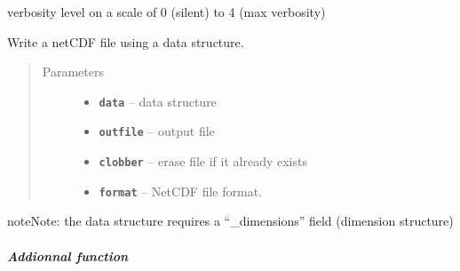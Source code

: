 \documentclass[letterpaper,10pt,english]{sphinxmanual}
\begin{document}
\begin{fulllineitems}
\begin{fulllineitems}
\label{altimetry.tools.nctools:altimetry.tools.nctools.nc.verbose}
verbosity level on a scale of 0 (silent) to 4 (max verbosity)

\end{fulllineitems}


\begin{fulllineitems}
\label{altimetry.tools.nctools:altimetry.tools.nctools.nc.write}
Write a netCDF file using a data structure.
\begin{quote}\begin{description}
\item[{Parameters}] \leavevmode\begin{itemize}
\item {} 
\textbf{\texttt{data}} -- data structure

\item {} 
\textbf{\texttt{outfile}} -- output file

\item {} 
\textbf{\texttt{clobber}} -- erase file if it already exists

\item {} 
\textbf{\texttt{format}} -- NetCDF file format.

\end{itemize}

\end{description}\end{quote}

\begin{notice}{note}{Note:}
the data structure requires a ``\_dimensions'' field (dimension structure)
\end{notice}

\end{fulllineitems}


\end{fulllineitems}



\subparagraph{Addionnal function}
\label{altimetry.tools.nctools:addionnal-function}\label{altimetry.tools.nctools:load-ncvar}\label{altimetry.tools.nctools:module-altimetry.tools.nctools}
\end{document}
